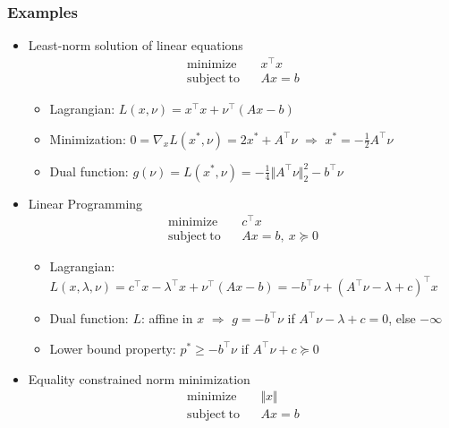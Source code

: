 \subsubsection*{Examples}
\begin{itemize}
    \item Least-norm solution of linear equations
    \begin{equation}\begin{aligned}
        \mathrm{minimize}~~&~~x^{\top}x \\
        \mathrm{subject~to}~~&~~Ax = b
    \end{aligned}\end{equation}
    \begin{itemize}
        \item Lagrangian: $L(x,\nu) = x^{\top}x + \nu^{\top}(Ax-b)$
        \item Minimization: $0 = \nabla_xL(x^\ast,\nu) = 2x^\ast+A^{\top}\nu$ $\Rightarrow$ $x^\ast=-\frac{1}{2}A^{\top}\nu$
        \item Dual function: $g(\nu)=L(x^\ast,\nu)=-\frac{1}{4}\Vert A^{\top}\nu\Vert_2^2-b^{\top}\nu$
    \end{itemize}
    \item Linear Programming
    \begin{equation}\begin{aligned}
        \mathrm{minimize}~~&~~c^{\top}x \\
        \mathrm{subject~to}~~&~~Ax = b,~x\succeq 0
    \end{aligned}\end{equation}
    \begin{itemize}
        \item Lagrangian: $L(x,\lambda,\nu)=c^{\top}x-\lambda^{\top}x+\nu^{\top}(Ax-b)=-b^{\top}\nu+(A^{\top}\nu-\lambda+c)^{\top}x$
        \item Dual function: $L$: affine in $x$ $\Rightarrow$ $g = -b^{\top}\nu$ if $A^{\top}\nu-\lambda+c=0$, else $-\infty$
        \item Lower bound property: $p^\ast\geq-b^{\top}\nu$ if $A^{\top}\nu + c \succeq 0$
    \end{itemize}
    \item Equality constrained norm minimization
    \begin{equation}\begin{aligned}
        \mathrm{minimize}~~&~~\Vert x \Vert \\
        \mathrm{subject~to}~~&~~Ax = b
    \end{aligned}\end{equation}

\end{itemize}

